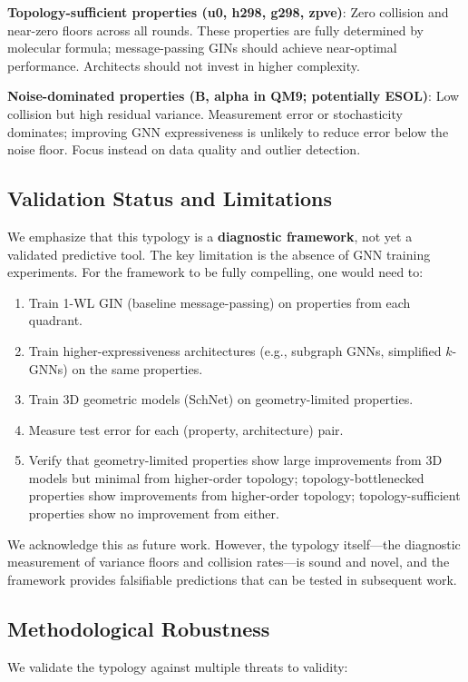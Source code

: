 \documentclass[11pt,letterpaper]{article}
\begin{document}
\textbf{Topology-sufficient properties (u0, h298, g298, zpve)}: Zero collision and near-zero floors across all rounds. These properties are fully determined by molecular formula; message-passing GINs should achieve near-optimal performance. Architects should not invest in higher complexity.

\textbf{Noise-dominated properties (B, alpha in QM9; potentially ESOL)}: Low collision but high residual variance. Measurement error or stochasticity dominates; improving GNN expressiveness is unlikely to reduce error below the noise floor. Focus instead on data quality and outlier detection.

\subsection{Validation Status and Limitations}

We emphasize that this typology is a \textbf{diagnostic framework}, not yet a validated predictive tool. The key limitation is the absence of GNN training experiments. For the framework to be fully compelling, one would need to:
\begin{enumerate}
  \item Train 1-WL GIN (baseline message-passing) on properties from each quadrant.
  \item Train higher-expressiveness architectures (e.g., subgraph GNNs, simplified $k$-GNNs) on the same properties.
  \item Train 3D geometric models (SchNet) on geometry-limited properties.
  \item Measure test error for each (property, architecture) pair.
  \item Verify that geometry-limited properties show large improvements from 3D models but minimal from higher-order topology; topology-bottlenecked properties show improvements from higher-order topology; topology-sufficient properties show no improvement from either.
\end{enumerate}
We acknowledge this as future work. However, the typology itself---the diagnostic measurement of variance floors and collision rates---is sound and novel, and the framework provides falsifiable predictions that can be tested in subsequent work.

\subsection{Methodological Robustness}

We validate the typology against multiple threats to validity:
\end{document}

